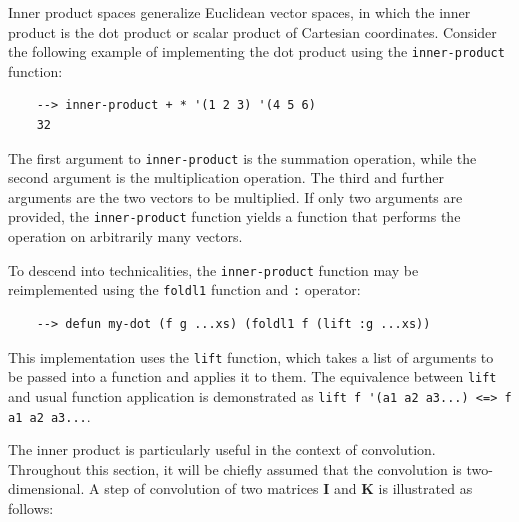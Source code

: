 Inner product spaces generalize Euclidean vector spaces, in which the inner product is the dot product or scalar product of Cartesian coordinates. Consider the following example of implementing the dot product using the \verb|inner-product| function:

\begin{Verbatim}
    --> inner-product + * '(1 2 3) '(4 5 6)
    32
\end{Verbatim}

The first argument to \verb|inner-product| is the summation operation, while the second argument is the multiplication operation. The third and further arguments are the two vectors to be multiplied. If only two arguments are provided, the \verb|inner-product| function yields a function that performs the operation on arbitrarily many vectors.

To descend into technicalities, the \verb|inner-product| function may be reimplemented using the \verb|foldl1| function and \verb|:| operator:

\begin{Verbatim}
    --> defun my-dot (f g ...xs) (foldl1 f (lift :g ...xs))
\end{Verbatim}

This implementation uses the \verb|lift| function, which takes a list of arguments to be passed into a function and applies it to them. The equivalence between \verb|lift| and usual function application is demonstrated as \verb|lift f '(a1 a2 a3...) <=> f a1 a2 a3...|.

The inner product is particularly useful in the context of convolution. Throughout this section, it will be chiefly assumed that the convolution is two-dimensional. A step of convolution of two matrices $\mathbf{I}$ and $\mathbf{K}$ is illustrated as follows:

